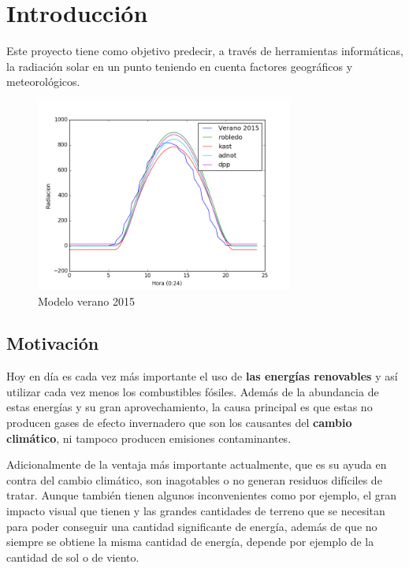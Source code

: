 \cleardoublepage

\chapter{Introducción}
\label{makereference}

Este proyecto tiene como objetivo predecir, a través de herramientas informáticas, la radiación solar en un punto teniendo en cuenta factores geográficos y meteorológicos.


\begin{figure}[htb]%
	
	\begin{center}
		\includegraphics[height=2.5in]{figures/verano2015.png}
		\caption{Modelo verano 2015}
	\end{center}
    
    \label{figure1}
\end{figure}

\section{Motivación}
\label{makereference1.1}

Hoy en día es cada vez más importante el uso de \textbf{las energías renovables} y así utilizar cada vez menos los combustibles fósiles.
Además de la abundancia de estas energías y su gran aprovechamiento, la causa principal es que estas no producen gases de efecto invernadero que son los causantes del \textbf{cambio climático}, ni tampoco producen emisiones contaminantes. 

Adicionalmente de la ventaja más importante actualmente, que es su ayuda en contra del cambio climático, son inagotables o no generan residuos difíciles de tratar. 
Aunque también tienen algunos inconvenientes como por ejemplo, el gran impacto visual que tienen y las grandes cantidades de terreno que se necesitan para poder conseguir una cantidad significante de energía, además de que no siempre se obtiene la misma cantidad de energía, depende por ejemplo de la cantidad de sol o de viento.

